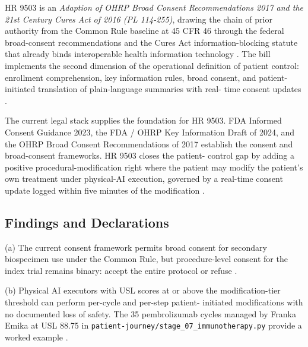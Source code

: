 
HR 9503 is an \textit{Adaption of OHRP Broad Consent Recommendations
2017 and the 21st Century Cures Act of 2016 (PL 114-255)}, drawing
the chain of prior authority from the Common Rule baseline at 45
CFR 46 through the federal broad-consent recommendations and the
Cures Act information-blocking statute that already binds
interoperable health information technology
\cite{ohrp_broad_consent_attachment_c_2017, rank1_cures_act_2016,
hhs_45cfr46_protection_human_subjects}. The bill implements the
second dimension of the operational definition of patient control:
enrollment comprehension, key information rules, broad consent, and
patient-initiated translation of plain-language summaries with real-
time consent updates \cite{fda_informed_consent_guidance_2023,
fda_ohrp_key_information_draft_2024}.

The current legal stack supplies the foundation for HR 9503. FDA
Informed Consent Guidance 2023, the FDA / OHRP Key Information Draft
of 2024, and the OHRP Broad Consent Recommendations of 2017 establish
the consent and broad-consent frameworks. HR 9503 closes the patient-
control gap by adding a positive procedural-modification right where
the patient may modify the patient's own treatment under physical-AI
execution, governed by a real-time consent update logged within
five minutes of the modification \cite{fda_informed_consent_guidance_2023,
fda_ohrp_key_information_draft_2024,
ohrp_broad_consent_attachment_c_2017}.

\subsection{Findings and Declarations}

(a) The current consent framework permits broad consent for secondary
biospecimen use under the Common Rule, but procedure-level consent
for the index trial remains binary: accept the entire protocol or
refuse \cite{hhs_45cfr46_protection_human_subjects,
ohrp_broad_consent_attachment_c_2017}.

(b) Physical AI executors with USL scores at or above the
modification-tier threshold can perform per-cycle and per-step patient-
initiated modifications with no documented loss of safety. The 35
pembrolizumab cycles managed by Franka Emika at USL 88.75 in
\texttt{patient-journey/stage\_07\_immunotherapy.py} provide a worked
example \cite{kawchak_2026_19119939, kawchak_2026_18778219}.

